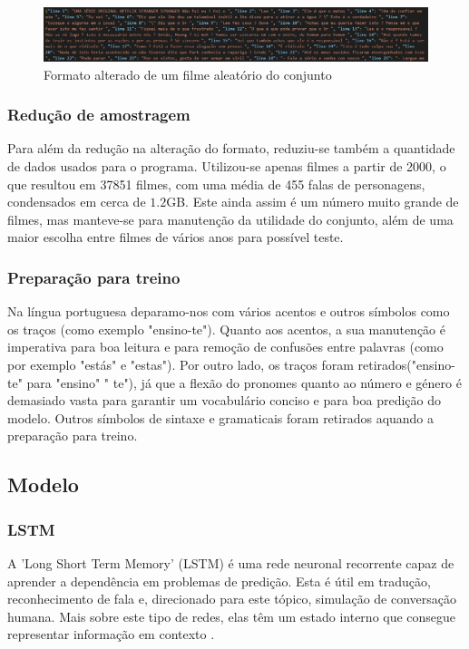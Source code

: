 \documentclass{article}
\begin{document}
\begin{figure}
	\centering
    \includegraphics[scale=0.28]{json.png}
    \caption{Formato alterado de um filme aleatório do conjunto}
    \label{jsonimg}
\end{figure}

\subsubsection{Redução de amostragem}
Para além da redução na alteração do formato, reduziu-se também a quantidade de dados usados para o programa. Utilizou-se apenas filmes a partir de 2000, o que resultou em 37851 filmes, com uma média de 455 falas de personagens, condensados em cerca de $1.2$GB. Este ainda assim é um número muito grande de filmes, mas manteve-se para manutenção da utilidade do conjunto, além de uma maior escolha entre filmes de vários anos para possível teste.

\subsubsection{Preparação para treino}
Na língua portuguesa deparamo-nos com vários acentos e outros símbolos como os traços (como exemplo "ensino-te"). Quanto aos acentos, a sua manutenção é imperativa para boa leitura e para remoção de confusões entre palavras (como por exemplo "estás" e "estas"). Por outro lado, os traços foram retirados("ensino-te" para "ensino" " te"), já que a flexão do pronomes quanto ao número e género é demasiado vasta para garantir um vocabulário conciso e para boa predição do modelo. Outros símbolos de sintaxe e gramaticais foram retirados aquando a preparação para treino.


\subsection{Modelo}


\subsubsection{LSTM}
A 'Long Short Term Memory' (LSTM) é uma rede neuronal recorrente capaz de aprender a dependência em problemas de predição. Esta é útil em tradução, reconhecimento de fala e, direcionado para este tópico, simulação de conversação humana. Mais sobre este tipo de redes, elas têm um estado interno que consegue representar informação em contexto \cite{bengio1994learning}.
\end{document}
